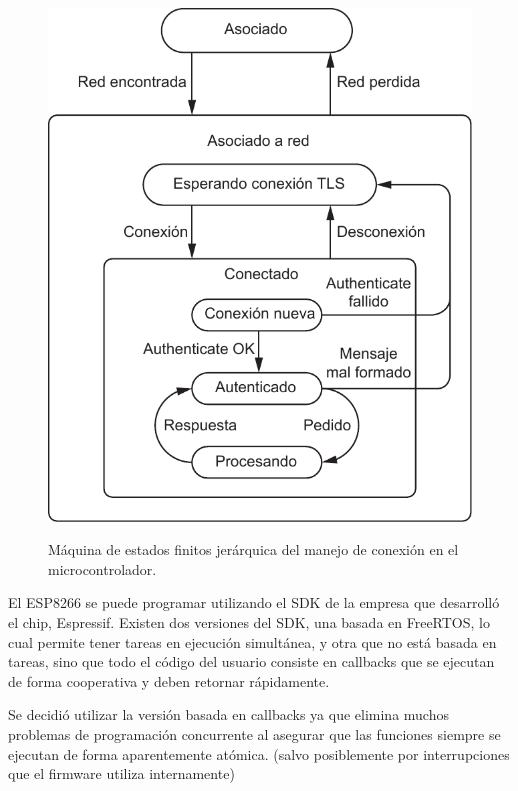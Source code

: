 \begin{figure}
	\centering
	\includegraphics[scale=0.8]{imagenes/fsm-micro.pdf}
	\label{fig:fsm-micro}
	\caption{Máquina de estados finitos jerárquica del manejo de conexión en el microcontrolador.}
\end{figure}

El ESP8266 se puede programar utilizando el SDK de la empresa que desarrolló el chip, Espressif. Existen dos versiones del SDK, una basada en FreeRTOS, lo cual permite tener tareas en ejecución simultánea, y otra que no está basada en tareas, sino que todo el código del usuario consiste en callbacks que se ejecutan de forma cooperativa y deben retornar rápidamente.

Se decidió utilizar la versión basada en callbacks ya que elimina muchos problemas de programación concurrente al asegurar que las funciones siempre se ejecutan de forma aparentemente atómica. (salvo posiblemente por interrupciones que el firmware utiliza internamente)


